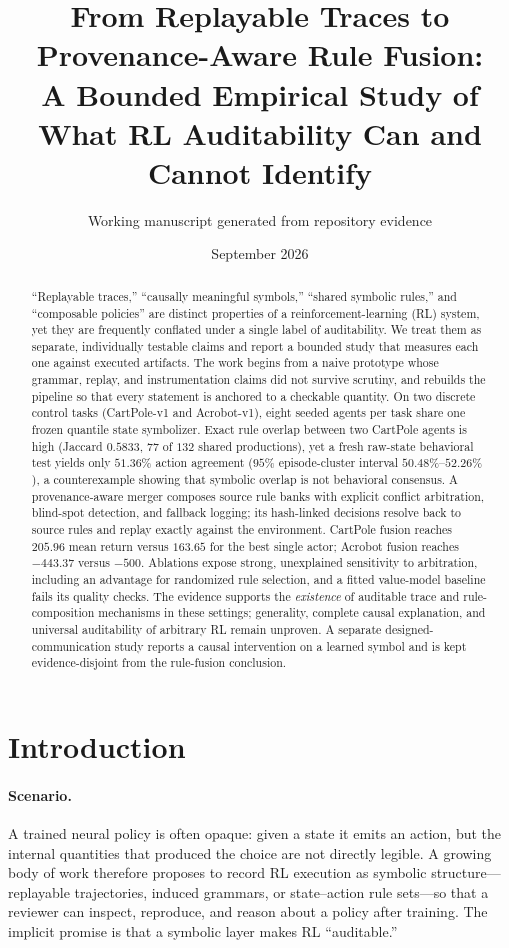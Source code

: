 \documentclass[11pt]{article}
\title{\bf From Replayable Traces to Provenance-Aware Rule Fusion:\\
A Bounded Empirical Study of What RL Auditability Can and Cannot Identify}
\author{Working manuscript generated from repository evidence}
\date{September 2026}
\begin{document}
\maketitle

\begin{abstract}
\noindent
``Replayable traces,'' ``causally meaningful symbols,'' ``shared symbolic rules,'' and
``composable policies'' are distinct properties of a reinforcement-learning (RL) system,
yet they are frequently conflated under a single label of auditability. We treat them as
separate, individually testable claims and report a bounded study that measures each one
against executed artifacts. The work begins from a naive prototype whose grammar, replay,
and instrumentation claims did not survive scrutiny, and rebuilds the pipeline so that every
statement is anchored to a checkable quantity. On two discrete control tasks
(CartPole-v1 and Acrobot-v1), eight seeded agents per task share one frozen quantile state
symbolizer. Exact rule overlap between two CartPole agents is high (Jaccard $0.5833$, $77$ of
$132$ shared productions), yet a fresh raw-state behavioral test yields only $51.36\%$ action
agreement ($95\%$ episode-cluster interval $50.48\%$--$52.26\%$), a counterexample showing
that symbolic overlap is not behavioral consensus. A provenance-aware merger composes source
rule banks with explicit conflict arbitration, blind-spot detection, and fallback logging;
its hash-linked decisions resolve back to source rules and replay exactly against the
environment. CartPole fusion reaches $205.96$ mean return versus $163.65$ for the best single
actor; Acrobot fusion reaches $-443.37$ versus $-500$. Ablations expose strong, unexplained
sensitivity to arbitration, including an advantage for randomized rule selection, and a fitted
value-model baseline fails its quality checks. The evidence supports the \emph{existence} of
auditable trace and rule-composition mechanisms in these settings; generality, complete causal
explanation, and universal auditability of arbitrary RL remain unproven. A separate
designed-communication study reports a causal intervention on a learned symbol and is kept
evidence-disjoint from the rule-fusion conclusion.
\end{abstract}

\section{Introduction}

\paragraph{Scenario.}
A trained neural policy is often opaque: given a state it emits an action, but the internal
quantities that produced the choice are not directly legible. A growing body of work therefore
proposes to record RL execution as symbolic structure---replayable trajectories, induced
grammars, or state--action rule sets---so that a reviewer can inspect, reproduce, and reason
about a policy after training. The implicit promise is that a symbolic layer makes RL
``auditable.''
\end{document}
